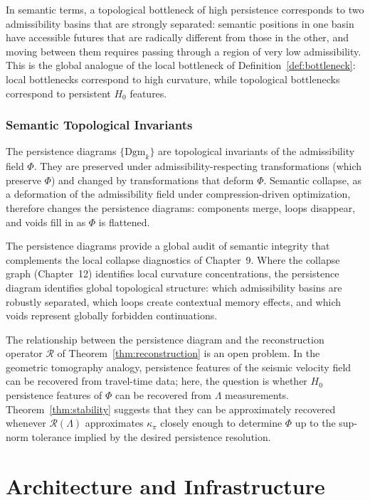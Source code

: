 \documentclass[12pt, oneside]{book}
\theoremstyle{plain-flyxion}
\theoremstyle{definition-flyxion}
\newcommand{\kpi}{\kappa_{\pi}}
\newcommand{\Lam}{\Lambda}
\begin{document}
In semantic terms, a topological bottleneck of high persistence corresponds to two
admissibility basins that are strongly separated: semantic positions in one basin have
accessible futures that are radically different from those in the other, and moving
between them requires passing through a region of very low admissibility. This is the
global analogue of the local bottleneck of Definition~\ref{def:bottleneck}:
local bottlenecks correspond to high curvature, while topological bottlenecks correspond
to persistent $H_0$ features.

\section{Semantic Topological Invariants}

The persistence diagrams $\{\mathrm{Dgm}_k\}$ are topological invariants of the
admissibility field $\Phi$. They are preserved under admissibility-respecting
transformations (which preserve $\Phi$) and changed by transformations that deform
$\Phi$. Semantic collapse, as a deformation of the admissibility field under
compression-driven optimization, therefore changes the persistence diagrams: components
merge, loops disappear, and voids fill in as $\Phi$ is flattened.

The persistence diagrams provide a global audit of semantic integrity that complements
the local collapse diagnostics of Chapter~9. Where the collapse graph (Chapter~12)
identifies local curvature concentrations, the persistence diagram identifies global
topological structure: which admissibility basins are robustly separated, which loops
create contextual memory effects, and which voids represent globally forbidden
continuations.

The relationship between the persistence diagram and the reconstruction operator
$\mathcal{R}$ of Theorem~\ref{thm:reconstruction} is an open problem. In the geometric
tomography analogy, persistence features of the seismic velocity field can be recovered
from travel-time data; here, the question is whether $H_0$ persistence features of
$\Phi$ can be recovered from $\Lam$ measurements. Theorem~\ref{thm:stability} suggests
that they can be approximately recovered whenever $\mathcal{R}(\Lam)$ approximates
$\kpi$ closely enough to determine $\Phi$ up to the sup-norm tolerance implied by the
desired persistence resolution.

\part{Architecture and Infrastructure}
\end{document}
